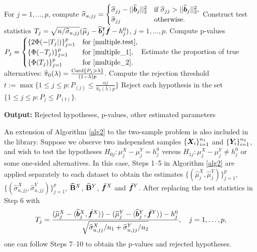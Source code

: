 \begin{algorithm}[!t]
\begin{algorithmic}[1]
\STATE For $j = 1, \ldots, p$, compute
$ \hat{\sigma}_{u,jj} =
  \begin{cases} \hat{\sigma}_{jj}-||\hat{\bb}_j||_2^2 & \text{if }  \hat{\sigma}_{jj} >||\hat{\bb}_j||_2^2 , \\
   \hat{\sigma}_{jj}        & \text{otherwise} .
   \end{cases}$
\STATE Construct test statistics $T_j= \sqrt{n/\hat{\sigma}_{u, jj} } (\hat{\mu}_{j}-\hat{\bb}_j^\T\bar{\bff}-h^0_j)$, $j=1,\ldots, p$.
\STATE Compute p-values $P_j= \begin{cases}
 \{2\Phi(-|T_j|) \}_{j=1}^p & \text{for \eqref{multiple.test}}, \\
  \{\Phi(-T_j) \}_{j=1}^p&\text{for \eqref{multiple_1}}, \\
  \{\Phi(T_j) \}_{j=1}^p& \text{for \eqref{multiple_2}}.
    \end{cases}$
\STATE Estimate the proportion of true alternatives: $\hat \pi_0(\lambda)=\frac{{\rm Card}\{P_j > \lambda\}}{(1-\lambda)p}$.
\STATE   Compute the rejection threshold $t:=\max \{  1 \leq j \leq p : P_{(j)}\leq \frac{\alpha j}{\hat \pi_0(\lambda) p}\}$
\STATE Reject each hypothesis in the set $\{ 1\leq j \leq p :  P_j \leq P_{(t)}\}$.
\end{algorithmic}
 \hspace*{\algorithmicindent} \hspace{-0.6cm} \textbf{Output:} Rejected hypotheses, p-values, other estimated parameters
\end{algorithm}

An extension of Algorithm \ref{alg2} to the two-sample problem is also included in the library. Suppose we observe two independent samples  $\{ \bX_i  \}_{i=1}^{n_1}$  and  $\{ \bY_i \}_{i=1}^{n_2}$, and wish to test the hypotheses $H_{0j}:  \mu_j^X-\mu_j^Y =h_j^0$ versus $H_{1j}: \mu_j^X-\mu_j^Y \neq h_j^0$ or some one-sided alternatives. In this case, Steps 1--5 in Algorithm \ref{alg2} are applied separately to each dataset to obtain the estimates $\{(\hat{\mu}^X_j, \hat{\mu}^Y_j)\}_{j=1}^p$, $\{(\hat{\sigma}^{X}_{u, jj}  , \hat{\sigma}^{Y}_{u, jj}) \}_{j=1}^p$, $\hat{\Bb}^X$, $\hat{\Bb}^Y$, $\bar{\bff}^X$ and $\bar{\bff}^Y$. After replacing the test statistics in Step 6 with
$$
	T_j=  \frac{   (\hat{\mu}^X_{j}-  \langle \hat{\bb}_j^X , \bar{\bff}^X\rangle ) -(\hat{\mu}^Y_{j}- \langle \hat{\bb}_j^Y , \bar{\bff}^Y \rangle ) -h^0_j   }{ \sqrt{ \hat{\sigma}^{ X}_{u, jj} / n_1  + \hat{\sigma}^{Y}_{u, jj} /n_2  } } ,  \quad j=1,\ldots, p,
$$
one can follow Steps 7--10 to obtain the p-values and rejected hypotheses.



